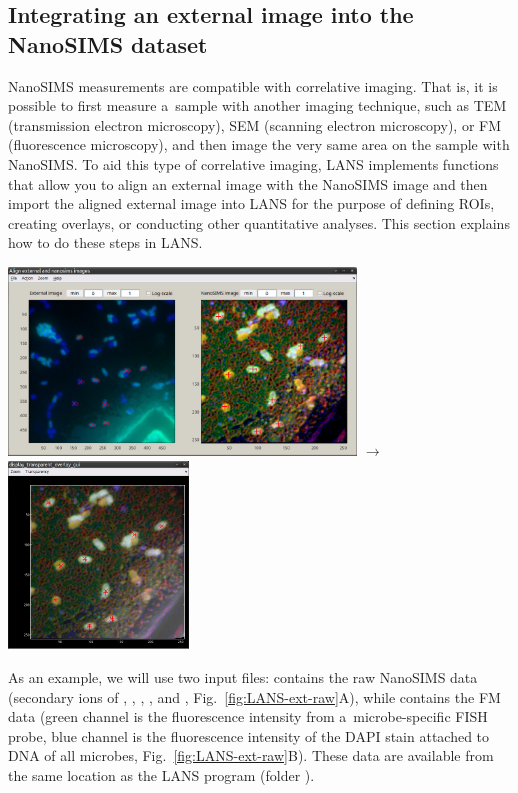 \subsection{Integrating an external image into the NanoSIMS dataset}
\setcounter{step}{0}

\goldbox{}
NanoSIMS measurements are compatible with correlative imaging. That is, it is possible to first measure a~sample with another imaging technique, such as TEM (transmission electron microscopy), SEM (scanning electron microscopy), or FM (fluorescence microscopy), and then image the very same area on the sample with NanoSIMS. To aid this type of correlative imaging, LANS implements functions that allow you to align an external image with the NanoSIMS image and then import the aligned external image into LANS for the purpose of defining ROIs, creating overlays, or conducting other quantitative analyses. This section explains how to do these steps in LANS.
\begin{center}
\includegraphics[height=5cm, valign=c]{figs7/LANS-ext-align-points}
$\rightarrow$
\includegraphics[height=5cm, valign=c]{figs7/LANS-ext-result1}
\end{center}
\tcbe

As an example, we will use two input files:  contains the raw NanoSIMS data (secondary ions of , , , ,  and , Fig.~\ref{fig:LANS-ext-raw}A), while  contains the FM data (green channel is the fluorescence intensity from a~microbe-specific FISH probe, blue channel is the fluorescence intensity of the DAPI stain attached to DNA of all microbes, Fig.~\ref{fig:LANS-ext-raw}B). These data are available from the same location as the LANS program (folder ).

